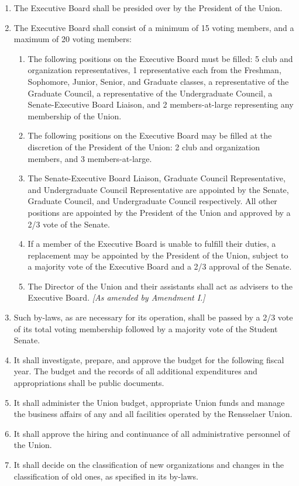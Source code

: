 \begin{enumerate}
\item The Executive Board shall be presided over by the President of the Union.
\item The Executive Board shall consist of a minimum of 15 voting members, and a maximum of 20 voting members:
  \begin{enumerate}
  \item The following positions on the Executive Board must be filled: 5 club and organization representatives, 1 representative each from the Freshman, Sophomore, Junior, Senior, and Graduate classes, a representative of the Graduate Council, a representative of the Undergraduate Council, a Senate-Executive Board Liaison, and 2 members-at-large representing any membership of the Union.
  \item The following positions on the Executive Board may be filled at the discretion of the President of the Union: 2 club and organization members, and 3 members-at-large.
  \item The Senate-Executive Board Liaison, Graduate Council Representative, and Undergraduate Council Representative are appointed by the Senate, Graduate Council, and Undergraduate Council respectively. All other positions are appointed by the President of the Union and approved by a 2/3 vote of the Senate.
  \item If a member of the Executive Board is unable to fulfill their duties, a replacement may be appointed by the President of the Union, subject to a majority vote of the Executive Board and a 2/3 approval of the Senate.
  \item The Director of the Union and their assistants shall act as advisers to the Executive Board. \textit{[As amended by Amendment I.]}
  \end{enumerate}
\item Such by-laws, as are necessary for its operation, shall be passed by a 2/3 vote of its total voting membership followed by a majority vote of the Student Senate.
\item It shall investigate, prepare, and approve the budget for the following fiscal year. The budget and the records of all additional expenditures and appropriations shall be public documents.
\item It shall administer the Union budget, appropriate Union funds and manage the business affairs of any and all facilities operated by the Rensselaer Union.
\item It shall approve the hiring and continuance of all administrative personnel of the Union.
\item It shall decide on the classification of new organizations and changes in the classification of old ones, as specified in its by-laws.
\end{enumerate}

